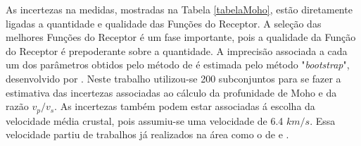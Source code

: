 As incertezas na medidas, mostradas na Tabela \ref{tabelaMoho}, estão diretamente ligadas a quantidade e qualidade das Funções do Receptor. A seleção das melhores Funções do Receptor é um fase importante, pois a qualidade da Função do Receptor é prepoderante sobre a quantidade. A imprecisão associada a cada um dos parâmetros obtidos pelo método de \cite{Zhu_Kanamori_2000} é estimada pelo método "\textit{bootstrap}", desenvolvido por \cite{efron_statistical_1991}. Neste trabalho utilizou-se 200  subconjuntos para se fazer a estimativa das incertezas associadas ao  cálculo da profunidade de Moho e da razão $v_{p}/v_{s}$. As incertezas também podem estar associadas á escolha da velocidade média crustal, pois assumiu-se uma velocidade de 6.4 $km/s$. Essa velocidade partiu de trabalhos já realizados na área como o de \cite{Bassini_1986} e \cite{sand_franca_crustal_2004}.

\pagebreak